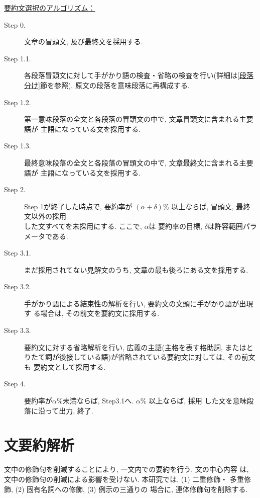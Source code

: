\noindent
\underline{要約文選択のアルゴリズム：}
\begin{description}

\item[Step 0.]
文章の冒頭文, 及び最終文を採用する. 

\item[Step 1.1.]
各段落冒頭文に対して手がかり語の検査・省略の検査を行い(詳細は\ref{段落
分け}節を参照), 原文の段落を意味段落に再構成する. 

\item[Step 1.2.]
第一意味段落の全文と各段落の冒頭文の中で, 文章冒頭文に含まれる主要語が
主語になっている文を採用する. 

\item[Step 1.3.]
最終意味段落の全文と各段落の冒頭文の中で, 文章最終文に含まれる主要語が
主語になっている文を採用する. 

\item[Step 2.]
Step 1が終了した時点で, 要約率が $(\alpha + \delta)\%$ 以上ならば, 
冒頭文, 最終文以外の採用\\した文すべてを未採用にする. ここで, $\alpha$は
要約率の目標, $\delta$は許容範囲パラメータである. 

\item[Step 3.1.]
まだ採用されてない見解文のうち, 文章の最も後ろにある文を採用する. 

\item[Step 3.2.]
手がかり語による結束性の解析を行い, 要約文の文頭に手がかり語が出現す
る場合は, その前文を要約文に採用する. 

\item[Step 3.3.]
要約文に対する省略解析を行い, 広義の主語(主格を表す格助詞, またはと
りたて詞が後接している語)が省略されている要約文に対しては, その前文も
要約文として採用する. 

\item[Step 4.]
要約率が$\alpha \%$未満ならば, Step3.1へ. $\alpha \%$ 以上ならば, 採用
した文を意味段落に沿って出力, 終了. \eos

\vspace*{-0.2mm}
\end{description}




\section{文要約解析}\label{文要約}

文中の修飾句を削減することにより, 一文内での要約を行う. 文の中心内容
は, 文中の修飾句の削減による影響を受けない. \vspace*{-0.2mm}本研究では, (1) 二重修飾・
多重修飾, (2) 固有名詞への修飾, (3) 例示の三通りの
場合に, 連体修飾句を削除する. \vspace*{-0.2mm}


